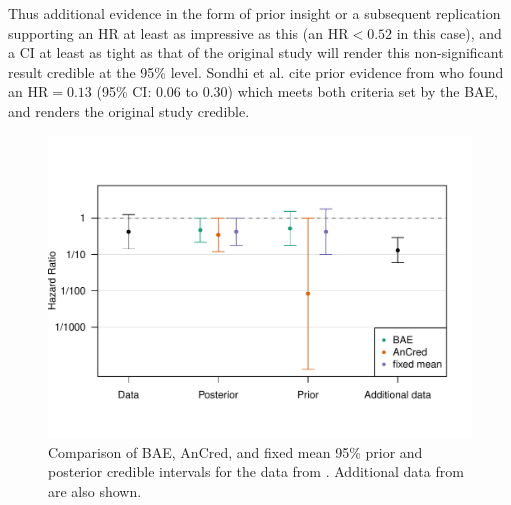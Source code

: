 Thus additional evidence in the form of prior insight or a subsequent
replication supporting an HR at least as impressive as this (\ie an
$\mbox{HR} < 0.52$ in this case), and a CI at least as tight as that of the
original study will render this non-significant result credible at the 95\%
level. Sondhi et al. cite prior evidence from \citet{Innocenti2019} who found an
$\mbox{HR} = 0.13$ (95\% CI: 0.06 to 0.30) which meets both criteria set by the
BAE, and renders the original study credible.





\begin{figure}[!htb]
\begin{knitrout}
\color{fgcolor}
\includegraphics[width=\maxwidth]{images/paper5/bae-comparison-fig-1}
\end{knitrout}
\caption{Comparison of BAE, AnCred, and fixed mean 95\% prior and posterior
  credible intervals for the data from \citet{Sondhi2021}. Additional data from
  \citet{Innocenti2019} are also shown.}
\label{fig:illustration}
\end{figure}


